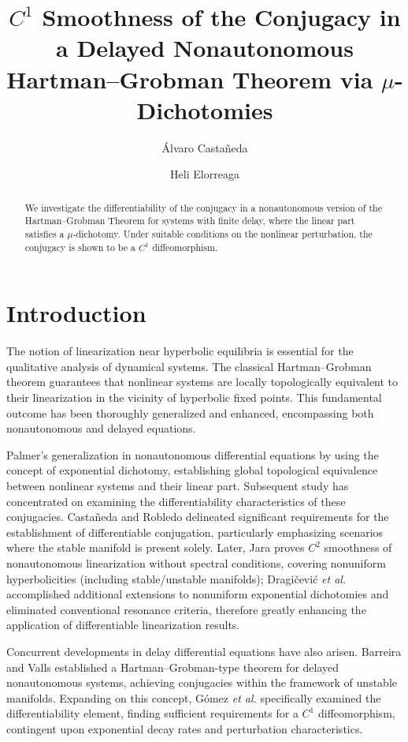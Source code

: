 \documentclass[9pt]{amsart}
\title[]{}
\title[]{$C^{1}$ Smoothness of the Conjugacy in a Delayed Nonautonomous Hartman--Grobman Theorem via $\mu$-Dichotomies
}
\author[Casta\~{n}eda]{\'Alvaro Casta\~{n}eda}
\author[Elorreaga]{Heli Elorreaga}
\numberwithin{equation}{section}
\numberwithin{lemma}{section}
\begin{document}
\begin{abstract}
We investigate the differentiability of the conjugacy in a nonautonomous version of the Hartman--Grobman Theorem for systems with finite delay, where the linear part satisfies a $\mu$-dichotomy. Under suitable conditions on the nonlinear perturbation, the conjugacy is shown to be a $C^{1}$ diffeomorphism.

\end{abstract}

\maketitle

\section{Introduction}
The notion of linearization near hyperbolic equilibria is essential for the qualitative analysis of dynamical systems.  The classical Hartman–Grobman theorem guarantees that nonlinear systems are locally topologically equivalent to their linearization in the vicinity of hyperbolic fixed points.  This fundamental outcome has been thoroughly generalized and enhanced, encompassing both nonautonomous and delayed equations.

 Palmer's \cite{Palmer} generalization in nonautonomous differential equations by using the concept of exponential dichotomy, establishing global topological equivalence between nonlinear systems and their linear part.  Subsequent study has concentrated on examining the differentiability characteristics of these conjugacies.  Castañeda and Robledo \cite{Castaneda4} delineated significant requirements for the establishment of differentiable conjugation, particularly emphasizing scenarios where the stable manifold is present solely. Later, Jara \cite{Jara} proves $C^2$ smoothness of nonautonomous linearization without spectral conditions, covering nonuniform hyperbolicities (including stable/unstable manifolds); Dragičević \textit{et al.} \cite{Dragicevic2} accomplished additional extensions to nonuniform exponential dichotomies and eliminated conventional resonance criteria, therefore greatly enhancing the application of differentiable linearization results.

 Concurrent developments in delay differential equations have also arisen.  Barreira and Valls \cite{B-v-per} established a Hartman–Grobman-type theorem for delayed nonautonomous systems, achieving conjugacies within the framework of unstable manifolds.  Expanding on this concept, G\'omez \textit{et al.} \cite{GCE} specifically examined the differentiability element, finding sufficient requirements for a $C^1$ diffeomorphism, contingent upon exponential decay rates and perturbation characteristics.
\end{document}
